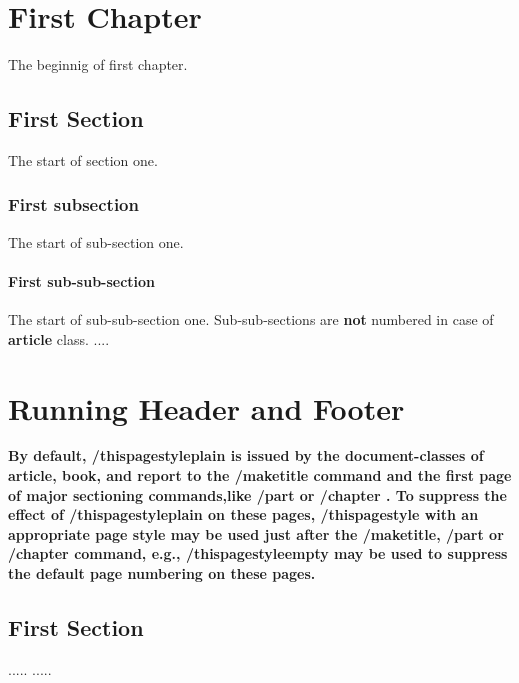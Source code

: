 \documentclass[openany]{book}
\begin{document}
\chapter{First Chapter}
	The beginnig of first chapter.
		\section{First Section}
		The start of section one.
			\subsection{First subsection}
			The start of sub-section one.
				\subsubsection{First sub-sub-section}
					The start of sub-sub-section one. Sub-sub-sections are {\bf\Huge not} numbered in case of {\bf\huge article} class.
					\newpage
					....
\chapter{Running Header and Footer}
\bfseries\large
By default, /thispagestyle{plain} is issued by the document-classes of article, book, and report to the 
/maketitle command and the first page of major sectioning commands,like /part{ } or /chapter{ }. 
To suppress the effect of /thispagestyle{plain} on these pages, /thispagestyle{ } with an appropriate
 page style may be used just after the /maketitle, /part{ } or /chapter{ } command, 
 e.g., /thispagestyle{empty} may be used to suppress the default page numbering on these pages.
    \section{First Section}
    .....
    \newpage
    .....
\end{document}
